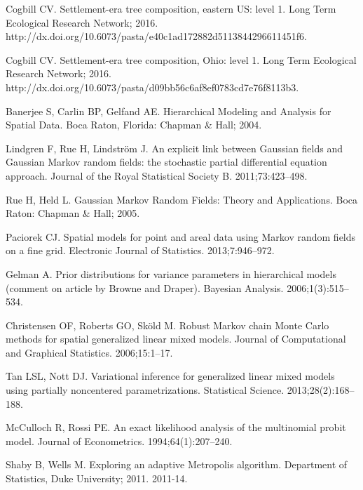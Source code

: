 \documentclass[10pt,letterpaper]{article}
\begin{document}
\begin{thebibliography}{10}
Cogbill CV.
\newblock Settlement-era tree composition, eastern {US}: level 1.
\newblock Long Term Ecological Research Network; 2016. http://dx.doi.org/10.6073/pasta/e40c1ad172882d5113844296611451f6.

Cogbill CV.
\newblock Settlement-era tree composition, {O}hio: level 1.
\newblock Long Term Ecological Research Network; 2016. http://dx.doi.org/10.6073/pasta/d09bb56c6af8ef0783cd7e76f8113b3.

Banerjee S, Carlin BP, Gelfand AE.
\newblock Hierarchical Modeling and Analysis for Spatial Data.
\newblock Boca Raton, Florida: Chapman \& Hall; 2004.

Lindgren F, Rue H, Lindstr{\"o}m J.
\newblock An explicit link between {G}aussian fields and {G}aussian {M}arkov
  random fields: the stochastic partial differential equation approach.
\newblock Journal of the Royal Statistical Society B. 2011;73:423--498.

Rue H, Held L.
\newblock Gaussian {M}arkov Random Fields: Theory and Applications.
\newblock Boca Raton: Chapman \& Hall; 2005.

Paciorek CJ.
\newblock Spatial models for point and areal data using {M}arkov random fields
  on a fine grid.
\newblock Electronic Journal of Statistics. 2013;7:946--972.

Gelman A.
\newblock Prior distributions for variance parameters in hierarchical models
  (comment on article by {B}rowne and {D}raper).
\newblock Bayesian Analysis. 2006;1(3):515--534.

Christensen OF, Roberts GO, Sk{\"o}ld M.
\newblock Robust {M}arkov chain {M}onte {C}arlo methods for spatial generalized
  linear mixed models.
\newblock Journal of Computational and Graphical Statistics. 2006;15:1--17.

Tan LSL, Nott DJ.
\newblock Variational inference for generalized linear mixed models using
  partially noncentered parametrizations.
\newblock Statistical Science. 2013;28(2):168--188.

McCulloch R, Rossi PE.
\newblock An exact likelihood analysis of the multinomial probit model.
\newblock Journal of Econometrics. 1994;64(1):207--240.

Shaby B, Wells M.
\newblock Exploring an adaptive {M}etropolis algorithm.
\newblock Department of Statistics, Duke University; 2011. 2011-14.


\end{thebibliography}
\end{document}
